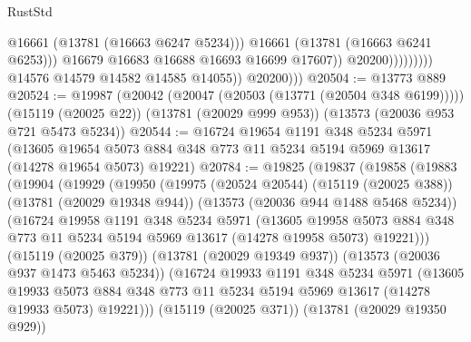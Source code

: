 \begin{lexlean}{RustStd}
\begin{coremodule}
                                        @16661
                                        (@13781 (@16663 @6247 @5234)))
                                      @16661
                                      (@13781 (@16663 @6241 @6253)))
                                    @16679
                                    @16683
                                    @16688
                                    @16693
                                    @16699
                                    @17607))
                                @20200)))))))))
              @14576
              @14579
              @14582
              @14585
              @14055))
          @20200)))
@20504 := @13773 @889
@20524 := @19987
    (@20042 (@20047 (@20503 (@13771 (@20504 @348 @6199)))))
    (@15119 (@20025 @22))
    (@13781 (@20029 @999 @953))
    (@13573 (@20036 @953 @721 @5473 @5234))
@20544 := @16724
    @19654
    @1191
    @348
    @5234
    @5971
    (@13605 @19654 @5073 @884 @348 @773 @11 @5234 @5194 @5969 @13617 (@14278 @19654 @5073) @19221)
@20784 := @19825
    (@19837
      (@19858
        (@19883
          (@19904
            (@19929
              (@19950
                (@19975
                  (@20524 @20544)
                  (@15119 (@20025 @388))
                  (@13781 (@20029 @19348 @944))
                  (@13573 (@20036 @944 @1488 @5468 @5234))
                  (@16724
                    @19958
                    @1191
                    @348
                    @5234
                    @5971
                    (@13605
                      @19958
                      @5073
                      @884
                      @348
                      @773
                      @11
                      @5234
                      @5194
                      @5969
                      @13617
                      (@14278 @19958 @5073)
                      @19221)))
                (@15119 (@20025 @379))
                (@13781 (@20029 @19349 @937))
                (@13573 (@20036 @937 @1473 @5463 @5234))
                (@16724
                  @19933
                  @1191
                  @348
                  @5234
                  @5971
                  (@13605
                    @19933
                    @5073
                    @884
                    @348
                    @773
                    @11
                    @5234
                    @5194
                    @5969
                    @13617
                    (@14278 @19933 @5073)
                    @19221)))
              (@15119 (@20025 @371))
              (@13781 (@20029 @19350 @929))

\end{coremodule}
\end{lexlean}
